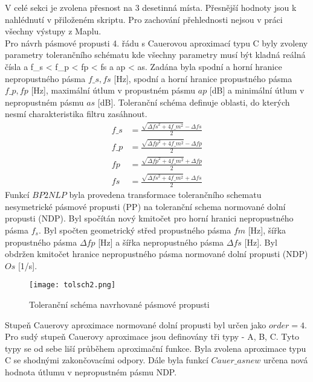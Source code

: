 V celé sekci je zvolena přesnost na 3 desetinná místa. Přesnější hodnoty jsou k nahlédnutí v přiloženém skriptu. Pro zachování přehlednosti nejsou v práci všechny výstupy z Maplu.\\
Pro návrh pásmové propusti 4. řádu s Cauerovou aproximací typu C byly zvoleny parametry tolerančního schématu 
\noindent kde všechny parametry musí být kladná reálná čísla a f\_s <  f\_p < fp < fs a ap < as. Zadána byla spodní a horní hranice nepropustného pásma $f\_s,fs$ [Hz], spodní a horní hranice propustného pásma $f\_p,fp$ [Hz], maximální útlum v propustném pásmu $ap$ [dB] a minimální útlum v nepropustném pásmu $as$ [dB]. Toleranční schéma definuje oblasti, do kterých nesmí charakteristika filtru zasáhnout.
\begin{align}
f\_s &= \frac{\sqrt{\Delta{fs}^2+4f\_m ^2}-\Delta{fs}}{2}\\
f\_p &= \frac{\sqrt{\Delta{fp}^2+4f\_m ^2}-\Delta{fp}}{2}\\
fp &= \frac{\sqrt{\Delta{fp}^2+4f\_m ^2}+\Delta{fp}}{2}\\
fs &= \frac{\sqrt{\Delta{fs}^2+4f\_m ^2}+\Delta{fs}}{2}
\end{align}
Funkcí $BP2NLP$ byla provedena transformace tolerančního schematu nesymetrické pásmové propusti (PP) na toleranční schema normované dolní propusti (NDP). Byl spočítán nový kmitočet pro horní hranici nepropustného pásma $f_s$. Byl spočten geometrický střed propustného pásma $fm$ [Hz], šířka propustného pásma $\Delta{fp}$ [Hz] a šířka nepropustného pásma $\Delta{fs}$ [Hz].
\noindent Byl obdržen kmitočet hranice nepropustného pásma normované dolní propusti (NDP) $Os$ [1/s].
\begin{figure}[h]
\centering
\texttt{[image: tolsch2.png]}
\caption{Toleranční schéma navrhované pásmové propusti}
\end{figure}
\noindent Stupeň Cauerovy aproximace normované dolní propusti byl určen jako $order = 4$. Pro sudý stupeň Cauerovy aproximace jsou definovány tři typy - A, B, C. Tyto typy se od sebe liší průběhem aproximační funkce. Byla zvolena aproximace typu C se shodnými zakončovacími odpory.
\noindent Dále byla funkcí $Cauer\_asnew$ určena nová hodnota útlumu v nepropustném pásmu NDP.

